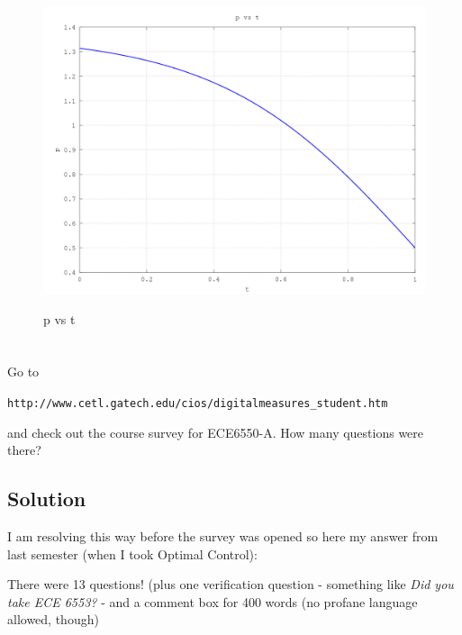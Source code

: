 \documentclass[10pt,a4paper]{article}
\begin{document}
\begin{center}
	\begin{figure}[H]
			  \includegraphics[scale=0.5]{figures/Question4P.png} 
	          \label{fig:Q4P}
	\caption{ p vs t}
	\end{figure}
\end{center}	

\section{}
Go to
\begin{center}
\texttt{http://www.cetl.gatech.edu/cios/digitalmeasures\_student.htm}
\end{center}

and check out the course survey for ECE6550-A. How many questions were there?

\subsection*{Solution}
I am resolving this way before the survey was opened so here my answer from last semester (when I took Optimal Control):
\medskip

There were 13 questions! (plus one verification question - something like {\em Did you take ECE 6553?} - and a comment box for 400 words (no profane language allowed, though)
\end{document}
